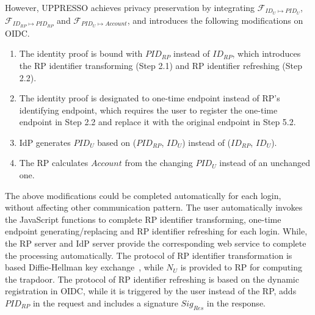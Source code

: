 
However, UPPRESSO achieves privacy preservation by integrating  $\mathcal{F}_{ID_{U} \mapsto PID_{U}}$, $\mathcal{F}_{ID_{RP} \mapsto PID_{RP}}$ and $\mathcal{F}_{PID_{U} \mapsto Account}$, and  introduces the following modifications on OIDC.

\begin{enumerate}
  \item The identity proof is bound with $PID_{RP}$ instead of $ID_{RP}$, which introduces the RP identifier transforming (Step 2.1)  and RP identifier refreshing (Step 2.2).
  \item The identity proof is designated to one-time endpoint instead of RP's identifying endpoint, which requires the user to register the one-time endpoint in Step 2.2 and replace it with the original endpoint in Step 5.2.
  \item IdP generates $PID_U$ based on ($PID_{RP}$, $ID_U$) instead of ($ID_{RP}$, $ID_U$).
  \item The RP calculates $Account$ from the changing $PID_U$ instead of an unchanged one.
\end{enumerate}

The above modifications could be completed automatically for each login, without affecting other communication pattern.
The user automatically invokes the JavaScript functions to complete RP identifier transforming, one-time endpoint generating/replacing and RP identifier refreshing for each login. While, the RP server and IdP server provide the corresponding web service to complete the processing automatically.
The protocol of RP identifier transformation is based Diffie-Hellman key exchange~\cite{DiffieH76}, while $N_U$ is provided to RP for computing the trapdoor.
The protocol of RP identifier refreshing is based on the dynamic registration in OIDC, while it is triggered by the user instead of the RP, adds $PID_{RP}$ in the request and includes a signature $Sig_{Res}$ in the response.

